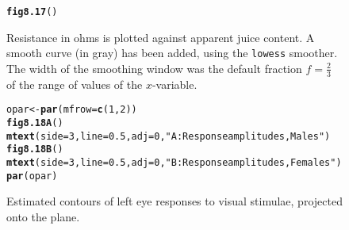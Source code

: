 \documentclass[12pt, a4paper,  BCOR=8.25mm, DIV=15]{scrartcl}\usepackage[]{graphicx}\usepackage[]{color}
\makeatletter
\newcommand{\hlnum}[1]{\textcolor[rgb]{0.686,0.059,0.569}{#1}}%
\newcommand{\hlstr}[1]{\textcolor[rgb]{0.192,0.494,0.8}{#1}}%
\newcommand{\hlstd}[1]{\textcolor[rgb]{0.345,0.345,0.345}{#1}}%
\newcommand{\hlkwb}[1]{\textcolor[rgb]{0.69,0.353,0.396}{#1}}%
\newcommand{\hlkwc}[1]{\textcolor[rgb]{0.333,0.667,0.333}{#1}}%
\newcommand{\hlkwd}[1]{\textcolor[rgb]{0.737,0.353,0.396}{\textbf{#1}}}%
\newenvironment{kframe}{%
 \def\at@end@of@kframe{}%
 \ifinner\ifhmode%
  \def\at@end@of@kframe{\end{minipage}}%
  \begin{minipage}{\columnwidth}%
 \fi\fi%
 \def\FrameCommand##1{\hskip\@totalleftmargin \hskip-\fboxsep
 \colorbox{shadecolor}{##1}\hskip-\fboxsep
     \hskip-\linewidth \hskip-\@totalleftmargin \hskip\columnwidth}%
 \MakeFramed {\advance\hsize-\width
   \@totalleftmargin\z@ \linewidth\hsize
   \@setminipage}}%
 {\par\unskip\endMakeFramed%
 \at@end@of@kframe}
\newenvironment{knitrout}{}{} %
\newcommand{\txtt}[1]{{\texttt{#1}}}
\makeatother
\begin{document}
\begin{figure}
\begin{knitrout}
\color{fgcolor}\begin{kframe}
\begin{alltt}
\hlkwd{fig8.17}\hlstd{()}
\end{alltt}
\end{kframe}
\end{knitrout}
  \caption{Resistance in ohms is plotted against apparent juice
    content.  A smooth curve (in gray) has been added, using the
    \txtt{lowess} smoother.  The width of the smoothing window was the
    default fraction $f = \frac{2}{3}$ of the range of values of the
    $x$-variable.}\label{fig:fruitohms}
\end{figure}

\begin{figure}
\begin{knitrout}
\color{fgcolor}\begin{kframe}
\begin{alltt}
\hlstd{opar} \hlkwb{<-} \hlkwd{par}\hlstd{(}\hlkwc{mfrow}\hlstd{=}\hlkwd{c}\hlstd{(}\hlnum{1}\hlstd{,}\hlnum{2}\hlstd{))}
\hlkwd{fig8.18A}\hlstd{()}
\hlkwd{mtext}\hlstd{(}\hlkwc{side}\hlstd{=}\hlnum{3}\hlstd{,} \hlkwc{line}\hlstd{=}\hlnum{0.5}\hlstd{,} \hlkwc{adj}\hlstd{=}\hlnum{0}\hlstd{,} \hlstr{"A: Response amplitudes, Males"}\hlstd{)}
\hlkwd{fig8.18B}\hlstd{()}
\hlkwd{mtext}\hlstd{(}\hlkwc{side}\hlstd{=}\hlnum{3}\hlstd{,} \hlkwc{line}\hlstd{=}\hlnum{0.5}\hlstd{,} \hlkwc{adj}\hlstd{=}\hlnum{0}\hlstd{,} \hlstr{"B: Response amplitudes, Females"}\hlstd{)}
\hlkwd{par}\hlstd{(opar)}
\end{alltt}
\end{kframe}
\end{knitrout}
\caption{Estimated contours of left eye responses to visual stimulae,
projected onto the plane.\label{fig:visAmp}}
\end{figure}
\end{document}
